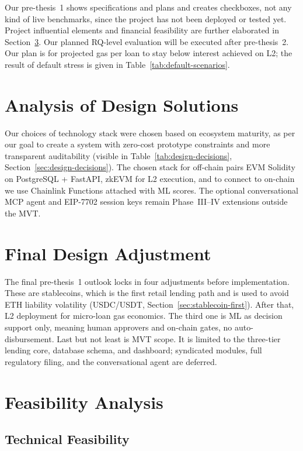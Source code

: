 \documentclass[12pt, a4paper]{report}
\begin{document}
Our pre-thesis~1 shows specifications and plans and creates checkboxes, not any kind of live benchmarks, since the project has not been deployed or tested yet. Project influential elements and financial feasibility are further elaborated in Section~\ref{sec:feasibility}. Our planned RQ-level evaluation will be executed after pre-thesis~2. Our plan is for projected gas per loan to stay below interest achieved on L2; the result of default stress is given in Table~\ref{tab:default-scenarios}.

\section{Analysis of Design Solutions}
\label{sec:design-solutions-ch5}

Our choices of technology stack were chosen based on ecosystem maturity, as per our goal to create a system with zero-cost prototype constraints and more transparent auditability (visible in Table~\ref{tab:design-decisions}, Section~\ref{sec:design-decisions}). The chosen stack for off-chain pairs EVM Solidity on PostgreSQL + FastAPI, zkEVM for L2 execution, and to connect to on-chain we use Chainlink Functions attached with ML scores. The optional conversational MCP agent and EIP-7702 session keys remain Phase~III--IV extensions outside the MVT.

\section{Final Design Adjustment}
\label{sec:final-design-adjustment}

The final pre-thesis~1 outlook locks in four adjustments before implementation. These are stablecoins, which is the first retail lending path and is used to avoid ETH liability volatility (USDC/USDT, Section~\ref{sec:stablecoin-first}). After that, L2 deployment for micro-loan gas economics. The third one is ML as decision support only, meaning human approvers and on-chain gates, no auto-disbursement. Last but not least is MVT scope. It is limited to the three-tier lending core, database schema, and dashboard; syndicated modules, full regulatory filing, and the conversational agent are deferred.

\section{Feasibility Analysis}
\label{sec:feasibility}

\subsection{Technical Feasibility}
\end{document}
